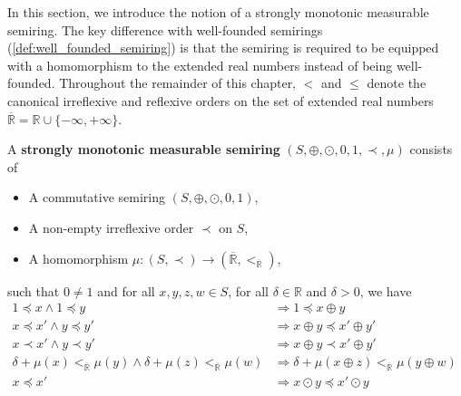 In this section, we introduce the notion of a strongly monotonic measurable semiring.
The key difference with well-founded semirings (\autoref{def:well_founded_semiring}) is that the semiring is required to be equipped with a homomorphism to the extended real numbers instead of being well-founded.
Throughout the remainder of this chapter, $<$ and $\leq$ denote the canonical irreflexive and reflexive orders on the set of extended real numbers $\overline{\mathbb{R}} = \mathbb{R} \cup \{-\infty, +\infty\}$.
\begin{definition} 
    \label{def:real_strongly_monotonic_semiring}
    A \textbf{strongly monotonic measurable semiring} $(S, \oplus, \odot, 0, 1, \prec, \mu)$ consists of
    \begin{itemize} 
        \item A commutative semiring $(S, \oplus, \odot, 0, 1)$,
        \item A non-empty irreflexive order $\prec$ on $S$,
        \item A homomorphism $\mu : (S, \prec) \to ( \overline{\mathbb{R}}, <_{\overline{\mathbb{R}}} )$,
    \end{itemize}
    such that $0 \neq 1$ and for all $x,y,z,w \in S$, for all $\delta \in \mathbb{R}$ and $\delta>0$, we have
        \begin{align*}
            1 \preceq x \land 1 \preceq y 
            &\Rightarrow
            1 \preceq x \oplus y
            &\tag{S0} \label{ax:s0} 
            \\ 
            x \preceq x' \land y \preceq y' 
            &\Rightarrow
            x \oplus y \preceq x' \oplus y'
            &\tag{S1} \label{ax:s1} 
            \\   
            x \prec x' \land y \prec y'  
            &\Rightarrow
            x \oplus y \prec x' \oplus y'
            &\tag{S2} \label{ax:s2} 
            \\
            \delta + \mu(x) <_{\overline{\mathbb{R}}} \mu(y) \land \delta + \mu(z) <_{\overline{\mathbb{R}}} \mu(w)
            &\Rightarrow
            \delta + \mu(x \oplus z) <_{\overline{\mathbb{R}}} \mu(y \oplus w)
            &\tag{S3} \label{ax:s2'}
            \\
            x \preceq x'
            &\Rightarrow 
            x \odot y \preceq x' \odot y 
            &\tag{S4} \label{ax:s3} 

\end{align*}
\end{definition}
